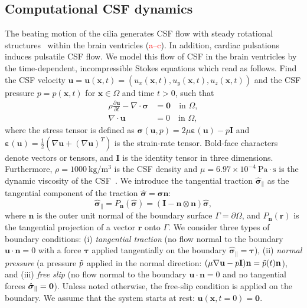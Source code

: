 \documentclass[fleqn]{wlscirep}
\newcommand{\pdifft}[1]{\frac{\partial  #1}{\partial t}}
\newcommand{\nn}{\mathbf{n}}
\newcommand{\rr}{\mathbf{r}}
\newcommand{\uu}{\mathbf{u}}
\newcommand{\xx}{\bm{x}}
\newcommand{\bsig}{\bm{\sigma}}
\newcommand{\bsigpar}{\hat{\bsig}_{\parallel}}
\newcommand{\beps}{\bm{\varepsilon}}
\newcommand{\btau}{\bm{\tau}}
\newcommand{\fixme}[1]{\textcolor{red}{#1}}
\begin{document}
\subsection*{Computational CSF dynamics}
The beating motion of the cilia generates CSF flow with steady rotational
structures~\cite{Olstad2019CiliaryDevelopment}
within the brain ventricles (\fixme{a--c}).
In addition, cardiac pulsations induces pulsatile CSF flow.
We model this flow of CSF in the brain ventricles by the time-dependent,
incompressible Stokes equations which read as follows.
Find the CSF velocity $\uu = \uu(\xx, t) = (u_x(\xx, t), u_y(\xx, t), u_z(\xx, t))$
and the CSF pressure $p = p(\xx, t)$ for $\xx \in \Omega$ and time $t>0$, such that
\begin{subequations}
    \begin{align}
      \rho \pdifft{\uu} - \nabla \cdot \bsig &= \mathbf{0}
      \quad \text{in } \Omega,\\
      \nabla \cdot \uu &= 0
      \quad  \text{in } \Omega,
  \end{align}
  \label{eq:stokes_eqs}%
\end{subequations}%
where the stress tensor is defined as $\bsig(\uu, p) = 2\mu\beps(\uu) - p\mathbf{I}$
and $\beps(\uu) = \frac{1}{2}\left(\nabla \uu + (\nabla\uu)^T\right)$ is the strain-rate tensor. 
Bold-face characters denote vectors or tensors, and $\mathbf{I}$ is the identity tensor in three dimensions.
Furthermore, $\rho=1000 \ \mathrm{kg/m^3}$ is the CSF density
and $\mu=6.97\times 10^{-4} \ \mathrm{Pa\cdot s}$ is the dynamic viscosity
of the CSF~\cite{Bloomfield1998EffectsFluid}.
We introduce the tangential traction $\bsigpar$ as the
tangential component of the traction $\hat{\bsig}=\bsig\nn$:
\begin{equation*}
    \bsigpar = P_{\nn}(\hat{\bsig}) = (\mathbf{I} - \nn\otimes\nn)\hat{\bsig},
\end{equation*}
where $\nn$ is the outer unit normal of the boundary surface $\Gamma = \partial\Omega$,
and $P_{\nn}(\rr)$ is the tangential projection of a vector $\rr$ onto $\Gamma$.
We consider three types of boundary conditions:
(i) \emph{tangential traction} (no flow normal to the boundary
$\uu \cdot \nn = 0$ with a force $\btau$ applied tangentially on the boundary $\bsigpar = \btau$),
(ii) \emph{normal pressure} (a pressure $\Tilde{p}$ applied in
the normal direction: $(\mu\nabla\uu - p\mathbf{I})\nn = \Tilde{p}(t)\nn$),
and (iii) \emph{free slip} (no flow normal to the boundary
$\uu \cdot \nn = 0$ and no tangential forces $\bsigpar = {\bf 0}$).
Unless noted otherwise, the free-slip condition is applied on the
boundary. We assume that the system starts at rest: $\uu(\xx, t=0) = \mathbf{0}$.
\end{document}
